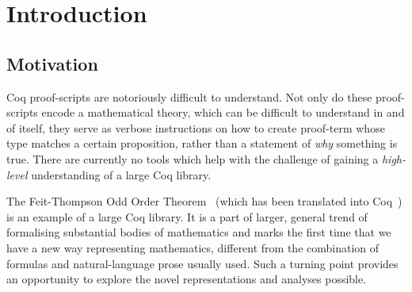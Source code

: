 
\chapter{Introduction}




\section{Motivation}

Coq proof-scripts are notoriously difficult to understand. Not only do these
proof-scripts encode a mathematical theory, which can be difficult to
understand in and of itself, they serve as verbose instructions on how to
create proof-term whose type matches a certain proposition, rather than a
statement of \emph{why} something is true. There are currently no tools which
help with the challenge of gaining a \emph{high-level} understanding of a large
Coq library.

The Feit-Thompson Odd Order Theorem~\cite{peterfalvi2000oot, bender1994oot}
(which has been translated into Coq~\cite{gonthier2013oot}) is an example of a
large Coq library. It is a part of larger, general trend of formalising
substantial bodies of mathematics and marks the first time that we have a new
way representing mathematics, different from the combination of formulas and
natural-language prose usually used. Such a turning point provides an
opportunity to explore the novel representations and analyses possible.

